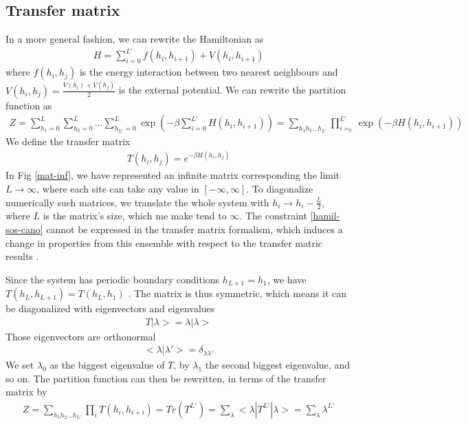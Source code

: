 \subsection{Transfer matrix}


In a more general fashion, we can rewrite the Hamiltonian as
\begin{align*}
H = \sum_{i=0}^{L'} f(h_i,h_{i+1}) + V(h_i,h_{i+1}) 
\end{align*}
where $f(h_i,h_j)$ is the energy interaction between two nearest neighbours and $V(h_i,h_j)=\frac{V(h_i)+V(h_j)}{2}$ is the external potential. We can rewrite the partition function as 
\begin{align}
Z = \sum_{h_1=0}^{L} \sum_{h_2=0}^{L}... \sum_{h_{L'}=0}^{L} \exp(- \beta \sum_{i=0}^{L'} H(h_i,h_{i+1}))
= \sum_{h_1 h_2 ... h_{L'}} \prod_{i=_0}^{L'} \exp(-\beta H(h_i,h_{i+1}))
\end{align}
We define the transfer matrix
\begin{align}
T(h_i,h_j) = e^{-\beta H(h_i,h_j)}
\label{matric-transfert}
\end{align}
In Fig \ref{mat-inf}, we have represented an infinite matrix corresponding the limit $L\to \infty$, where each site can take any value in $[-\infty,\infty]$. To diagonalize numerically such matrices, we translate the whole system with $h_i \to h_i - \frac{L}{2}$, where $L$ is the matrix's size, which me make tend to $\infty$.
The constraint \eqref{hamil-sos-cano} cannot be expressed in the transfer matrix formalism, which induces a change in properties from this ensemble with respect to the transfer matric results \cite{siegert_scaling_1993}.

Since the system has periodic boundary conditions $h_{L+1} = h_1$, we have $T(h_L,h_{L+1}) = T(h_L,h_1)$ \cite{pearce_exact_1989}. The matrix is thus symmetric, which means it can be diagonalized with eigenvectors and eigenvalues 
\begin{align}
T | \lambda> = \lambda |\lambda>
\end{align}
Those eigenvectors are orthonormal
\begin{align}
< \lambda | \lambda'> = \delta_{\lambda \lambda'}
\end{align}
We set $\lambda_0$ as the biggest eigenvalue of $T$, by $\lambda_1$ the second biggest eigenvalue, and so on. The partition function can then be rewritten, in terms of the transfer matrix \cite{abraham_transfer_1973} by
\begin{align}
Z = \sum_{h_1 h_2 ... h_{L'}} \prod_{i} T(h_i,h_{i+i}) = Tr( T^{L'}) = \sum_\lambda <\lambda | T^{L'} | \lambda> = \sum_\lambda \lambda^{L'}
\label{partition-trace-lambda}
\end{align}


